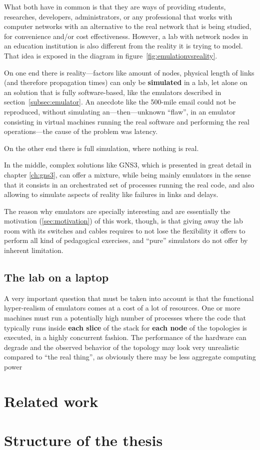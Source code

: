 What both have in common is that they are ways of providing students, researches, developers, administrators, or any professional that works with computer networks with an alternative to the real network that is being studied, for convenience and/or cost effectiveness. However, a lab with network nodes in an education institution is also different from the reality it is trying to model. That idea is exposed in the diagram in figure~\ref{fig:emulationvsreality}.

On one end there is reality---factors like amount of nodes, physical length of links (and therefore propagation times) can only be \textbf{simulated} in a lab, let alone on an solution that is fully software-based, like the emulators described in section~\ref{subsec:emulator}. An anecdote like the 500-mile email could not be reproduced, without simulating an---then---unknown ``flaw'', in an emulator consisting in virtual machines running the real software and performing the real operations---the cause of the problem was latency.

On the other end there is full simulation, where nothing is real.

In the middle, complex solutions like GNS3, which is presented in great detail in chapter \ref{ch:gns3}, can offer a mixture, while being mainly emulators in the sense that it consists in an orchestrated set of processes running the real code, and also allowing to simulate aspects of reality like failures in links and delays.

The reason why emulators are specially interesting and are essentially the motivation (\ref{sec:motivation}) of this work, though, is that giving away the lab room with its switches and cables requires to not lose the flexibility it offers to perform all kind of pedagogical exercises, and ``pure'' simulators do not offer by inherent limitation.


\subsection{The lab on a laptop}
\label{subsec:thelabonalaptop}

A very important question that must be taken into account is that the functional hyper-realism of emulators comes at a cost of a lot of resources.
One or more machines must run a potentially high number of processes where the code that typically runs inside \textbf{each slice} of the stack for \textbf{each node} of the topologies is executed, in a highly concurrent fashion.
The performance of the hardware can degrade and the observed behavior of the topology may look very unrealistic compared to ``the real thing'', as obviously there may be less aggregate computing power



\section{Related work}
\label{sec:relatedwork}

\section{Structure of the thesis}
\label{sec:structure}


